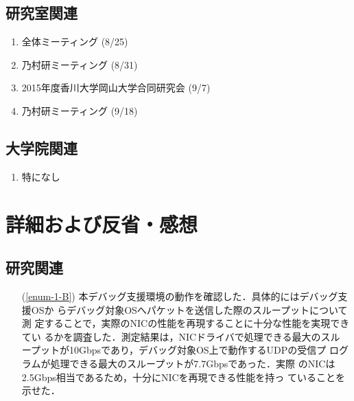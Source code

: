 \documentclass[fleqn, 14pt]{extarticle}
\begin{document}
    \subsection{研究室関連}
    \label{sec-2-2}
    \begin{enumerate}

        \item 全体ミーティング
            \hfill
            \label{enum-lab1}
            (8/25)

        \item 乃村研ミーティング
            \hfill
            \label{enum-lab1}
            (8/31)

        \item 2015年度香川大学岡山大学合同研究会
            \hfill
            \label{enum-lab1}
            (9/7)

        \item 乃村研ミーティング
            \hfill
            \label{enum-lab1}
            (9/18)

    \end{enumerate}

    \subsection{大学院関連}
    \label{sec2-3}
    \begin{enumerate}

        \item 特になし
            \hfill
            \label{enum-univ1}

    \end{enumerate}

    \section{詳細および反省・感想}
    \label{sec-3}

    \subsection{研究関連}
    \label{sec-3-2}

    \begin{itemize}

        \item[(\ref{enum-1-B})]
            本デバッグ支援環境の動作を確認した．具体的にはデバッグ支援OSか
            らデバッグ対象OSへパケットを送信した際のスループットについて測
            定することで，実際のNICの性能を再現することに十分な性能を実現できてい
            るかを調査した．測定結果は，NICドライバで処理できる最大のスル
            ープットが10Gbpsであり，デバッグ対象OS上で動作するUDPの受信プ
            ログラムが処理できる最大のスループットが7.7Gbpsであった．実際
            のNICは2.5Gbps相当であるため，十分にNICを再現できる性能を持っ
            ていることを示せた．

    \end{itemize}
\end{document}
